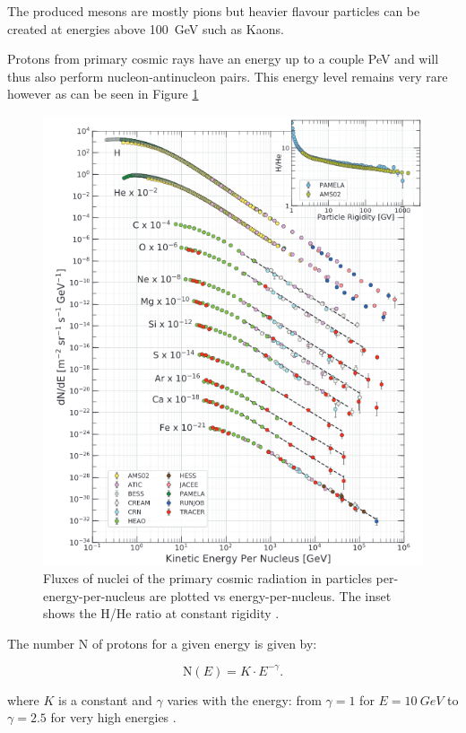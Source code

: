 The produced mesons are mostly pions but heavier flavour particles can be created at energies above \SI{100}{GeV} such as Kaons.

Protons from primary cosmic rays have an energy up to a couple PeV and will thus also perform nucleon-antinucleon pairs. This energy level remains very rare however as can be seen in Figure \ref{fig:knee}

\begin{figure}[htbp]
\centering
\includegraphics[width=\linewidth]{./fig/knee.png}
\caption{Fluxes of nuclei of the primary cosmic radiation in particles per-energy-per-nucleus are plotted vs energy-per-nucleus. The inset shows the H/He ratio at constant rigidity \cite{Tanabashi:2018oca}.}
\label{fig:knee}
\end{figure}

The number N of protons for a given energy is given by:

\begin{equation*}
\text{N}(E)=K\cdot E^{-\gamma}.
\end{equation*}

where $K$ is a constant and $\gamma$ varies with the energy: from $\gamma=1$ for $E=\SI{10}{GeV}$ to $\gamma=2.5$ for very high energies \cite{Tanabashi:2018oca}.


